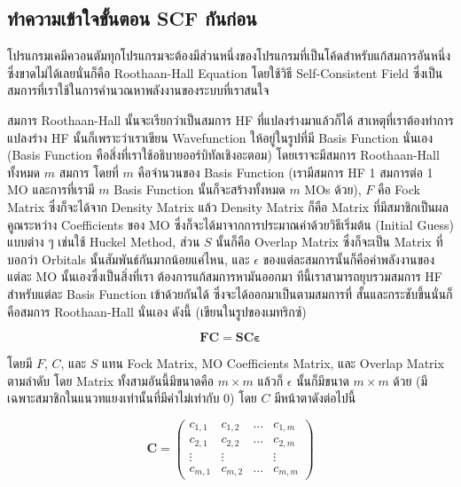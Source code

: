 \subsection{ทำความเข้าใจขั้นตอน SCF กันก่อน}

โปรแกรมเคมีควอนตัมทุกโปรแกรมจะต้องมีส่วนหนึ่งของโปรแกรมที่เป็นโค้ดสำหรับแก้สมการอันหนึ่งซึ่งขาดไม่ได้เลยนั่นก็คือ Roothaan-Hall
Equation โดยใช้วิธี Self-Consistent Field ซึ่งเป็นสมการที่เราใช้ในการคำนวณหาพลังงานของระบบที่เราสนใจ

สมการ Roothaan-Hall นั้นจะเรียกว่าเป็นสมการ HF ที่แปลงร่างมาแล้วก็ได้ สาเหตุที่เราต้องทำการแปลงร่าง HF นั้นก็เพราะว่าเราเขียน
Wavefunction ให้อยู่ในรูปที่มี Basis Function นั่นเอง (Basis Function คือสิ่งที่เราใช้อธิบายออร์บิทัลเชิงอะตอม) โดยเราจะมีสมการ
Roothaan-Hall ทั้งหมด $m$ สมการ โดยที่ $m$ คือจำนวนของ Basis Function (เรามีสมการ HF 1 สมการต่อ 1 MO และการที่เรามี
$m$ Basis Function นั้นก็จะสร้างทั้งหมด $m$ MOs ด้วย), $F$ คือ Fock Matrix ซึ่งก็จะได้จาก Density Matrix แล้ว
Density Matrix ก็คือ Matrix ที่มีสมาชิกเป็นผลคูณระหว่าง Coefficients ของ MO ซึ่งก็จะได้มาจากการประมาณค่าด้วยวิธีเริ่มต้น
(Initial Guess) แบบต่าง ๆ เช่นใช้ Huckel Method, ส่วน $S$ นั้นก็คือ Overlap Matrix ซึ่งก็จะเป็น Matrix ที่บอกว่า
Orbitals นั้นสัมพันธ์กันมากน้อยแค่ไหน, และ $\epsilon$ ของแต่ละสมการนั้นก็คือค่าพลังงานของแต่ละ MO นั้นเองซึ่งเป็นสิ่งที่เรา%
ต้องการแก้สมการหามันออกมา ทีนี้เราสามารถยุบรวมสมการ HF สำหรับแต่ละ Basis Function เข้าด้วยกันได้ ซึ่งจะได้ออกมาเป็นตามสมการที่%
สั้นและกระชับขึ้นนั่นก็คือสมการ Roothaan-Hall นั่นเอง ดังนี้ (เขียนในรูปของเมทริกซ์)

\begin{equation}
  \bm{FC} = \bm{SC \varepsilon}
\end{equation}

โดยมี $F$, $C$, และ $S$ แทน Fock Matrix, MO Coefficients Matrix, และ Overlap Matrix ตามลำดับ โดย Matrix
ทั้งสามอันนี้มีขนาดคือ $m \times m$ แล้วก็ $\epsilon$ นั้นก็มีขนาด $m \times m$ ด้วย (มีเฉพาะสมาชิกในแนวทแยงเท่านั้นที่มีค่าไม่เท่ากับ 0)
โดย $C$ มีหน้าตาดังต่อไปนี้

\begin{equation}
  \bm{C}
  =
  \left( \begin{matrix} c_{1,1} & c_{1,2} & ... & c_{1,m} \\
               c_{2,1} & c_{2,2} & ... & c_{2,m} \\
               \vdots  & \vdots  &     & \vdots  \\
               c_{m,1} & c_{m,2} & ... & c_{m,m}
    \end{matrix} \right)
\end{equation}

